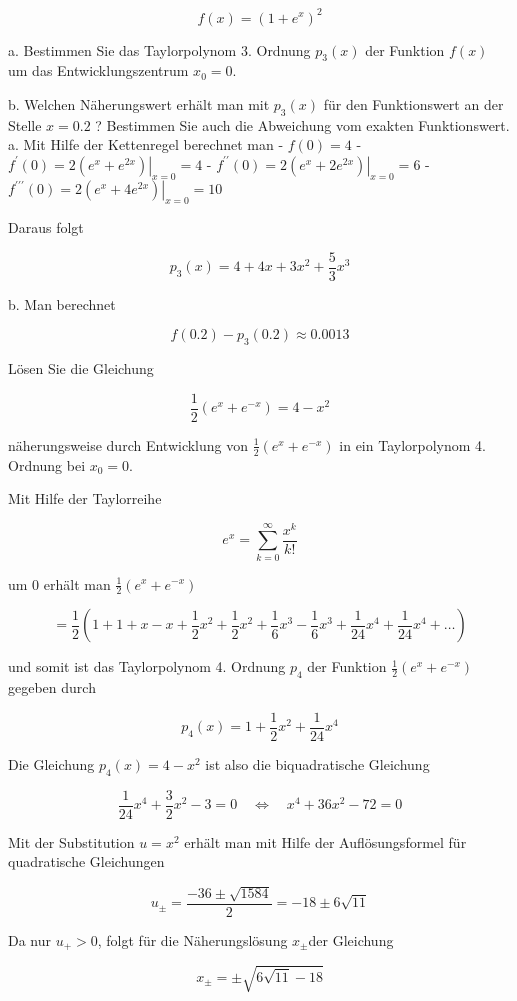 \begin{example}

$$
f(x)=\left(1+e^{x}\right)^{2}
$$

a. Bestimmen Sie das Taylorpolynom 3. Ordnung $p_{3}(x)$ der Funktion $f(x)$ um das Entwicklungszentrum $x_{0}=0$.

b. Welchen Näherungswert erhält man mit $p_{3}(x)$ für den Funktionswert an der Stelle $x=0.2$ ? Bestimmen Sie auch die Abweichung vom exakten Funktionswert.
\tcblower
a. Mit Hilfe der Kettenregel berechnet man
- $f(0)=4$
- $f^{\prime}(0)=\left.2\left(e^{x}+e^{2 x}\right)\right|_{x=0}=4$
- $f^{\prime \prime}(0)=\left.2\left(e^{x}+2 e^{2 x}\right)\right|_{x=0}=6$
- $f^{\prime \prime \prime}(0)=\left.2\left(e^{x}+4 e^{2 x}\right)\right|_{x=0}=10$

Daraus folgt

$$
p_{3}(x)=4+4 x+3 x^{2}+\frac{5}{3} x^{3}
$$

b. Man berechnet

$$
f(0.2)-p_{3}(0.2) \approx 0.0013
$$
\end{example}

\begin{example}
    Lösen Sie die Gleichung

$$
\frac{1}{2}\left(e^{x}+e^{-x}\right)=4-x^{2}
$$

näherungsweise durch Entwicklung von $\frac{1}{2}\left(e^{x}+e^{-x}\right)$ in ein Taylorpolynom 4. Ordnung bei $x_{0}=0$.

\tcblower
Mit Hilfe der Taylorreihe

$$
e^{x}=\sum_{k=0}^{\infty} \frac{x^{k}}{k!}
$$

um 0 erhält man $\frac{1}{2}\left(e^{x}+e^{-x}\right)$

$$
=\frac{1}{2}\left(1+1+x-x+\frac{1}{2} x^{2}+\frac{1}{2} x^{2}+\frac{1}{6} x^{3}-\frac{1}{6} x^{3}+\frac{1}{24} x^{4}+\frac{1}{24} x^{4}+\ldots\right)
$$

und somit ist das Taylorpolynom 4. Ordnung $p_{4}$ der Funktion $\frac{1}{2}\left(e^{x}+e^{-x}\right)$ gegeben durch

$$
p_{4}(x)=1+\frac{1}{2} x^{2}+\frac{1}{24} x^{4}
$$

Die Gleichung $p_{4}(x)=4-x^{2}$ ist also die biquadratische Gleichung

$$
\frac{1}{24} x^{4}+\frac{3}{2} x^{2}-3=0 \quad \Leftrightarrow \quad x^{4}+36 x^{2}-72=0
$$

Mit der Substitution $u=x^{2}$ erhält man mit Hilfe der Auflösungsformel für quadratische Gleichungen

$$
u_{ \pm}=\frac{-36 \pm \sqrt{1584}}{2}=-18 \pm 6 \sqrt{11}
$$

Da nur $u_{+}>0$, folgt für die Näherungslösung $x_{ \pm}$der Gleichung

$$
x_{ \pm}= \pm \sqrt{6 \sqrt{11}-18}
$$
\end{example}


